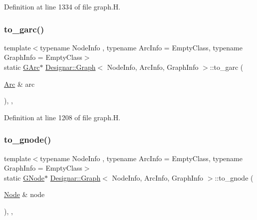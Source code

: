 Definition at line 1334 of file graph.\+H.

\mbox{\label{class_designar_1_1_graph_ab79eb63dd332e483db77da69c1b04522}} 
\subsubsection{\texorpdfstring{to\+\_\+garc()}{to\_garc()}}
{\footnotesize\ttfamily template$<$typename Node\+Info , typename Arc\+Info  = Empty\+Class, typename Graph\+Info  = Empty\+Class$>$ \\
static \hyperlink{class_designar_1_1_graph_a5ad9e18b71899c2d4979426e367e5573}{G\+Arc}$\ast$ \hyperlink{class_designar_1_1_graph}{Designar\+::\+Graph}$<$ Node\+Info, Arc\+Info, Graph\+Info $>$\+::to\+\_\+garc (\begin{DoxyParamCaption}\item[{\hyperlink{class_designar_1_1_graph_a74c730ef4ce2d20f998d72bd25c2b5bf}{Arc} \&}]{arc }\end{DoxyParamCaption})\hspace{0.3cm}{\ttfamily [inline]}, {\ttfamily [static]}, {\ttfamily [protected]}}



Definition at line 1208 of file graph.\+H.

\mbox{\label{class_designar_1_1_graph_a23038b7502c6fdb53b23453b19579c0e}} 
\subsubsection{\texorpdfstring{to\+\_\+gnode()}{to\_gnode()}}
{\footnotesize\ttfamily template$<$typename Node\+Info , typename Arc\+Info  = Empty\+Class, typename Graph\+Info  = Empty\+Class$>$ \\
static \hyperlink{class_designar_1_1_graph_a7e61951db0bb9bfa8a2e317440d4e17f}{G\+Node}$\ast$ \hyperlink{class_designar_1_1_graph}{Designar\+::\+Graph}$<$ Node\+Info, Arc\+Info, Graph\+Info $>$\+::to\+\_\+gnode (\begin{DoxyParamCaption}\item[{\hyperlink{class_designar_1_1_graph_a5dfc7dba9d092ac489c72e40390c37d0}{Node} \&}]{node }\end{DoxyParamCaption})\hspace{0.3cm}{\ttfamily [inline]}, {\ttfamily [static]}, {\ttfamily [protected]}}



